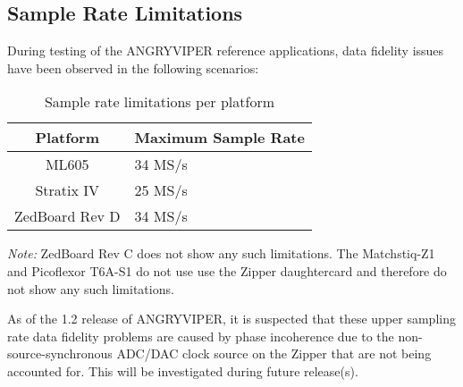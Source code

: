 \subsection*{Sample Rate Limitations}
During testing of the ANGRYVIPER reference applications, data fidelity issues have been observed in the following scenarios:
\begin{table}[H]

		\label{table:samplelimits}
		\begin{tabularx}{\textwidth}{|c|X|}
			\hline
			\rowcolor{blue}
			\textbf{Platform} & \textbf{Maximum Sample Rate} \\
			\hline
			ML605 & 34 MS/s\\
			\hline
			Stratix IV & 25 MS/s\\
			\hline
			ZedBoard Rev D & 34 MS/s\\
		    \hline
		\end{tabularx}
		\caption{Sample rate limitations per platform}

		\textit{Note: } ZedBoard Rev C does not show any such limitations. The Matchstiq-Z1 and Picoflexor T6A-S1 do not use use the Zipper daughtercard and therefore do not show any such limitations.
\end{table}

\noindent As of the 1.2 release of ANGRYVIPER, it is suspected that these upper sampling rate data fidelity problems are caused by phase incoherence due to the non-source-synchronous ADC/DAC clock source on the Zipper that are not being accounted for. This will be investigated during future release(s).
